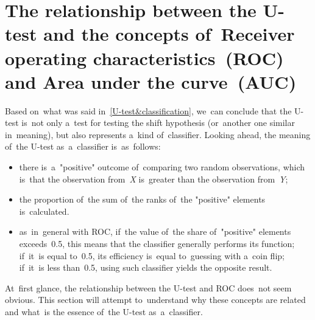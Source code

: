 \documentclass[]{scrreprt}
\begin{document}
\section{The relationship between the U-test and the concepts of~Receiver operating characteristics~(ROC) and Area under the curve~(AUC)}\label{U-AUC}
Based on~what was said in~\ref{U-test&classification}, we~can conclude that the U-test is~not only a~test for testing the shift hypothesis (or~another one similar in~meaning), but also represents a~kind of~classifier. Looking ahead, the meaning of~the U-test as~a~classifier is~as~follows:
\begin{itemize}
	\item there is~a~"positive" outcome of~comparing two random observations, which is~that the observation from~\textit{X} is~greater than the observation from~\textit{Y};
	\item the proportion of~the sum of~the ranks of~the "positive" elements is~calculated.
	\item as~in~general with ROC, if~the value of~the share of~"positive" elements exceeds~0.5, this means that the classifier generally performs its function; if~it~is equal to~0.5, its efficiency is~equal to~guessing with a~coin flip; if~it~is less than~0.5, using such classifier yields the opposite result.	 
\end{itemize}
At~first glance, the relationship between the U-test and ROC does~not seem obvious. This section will attempt to~understand why these concepts are related and what~is the essence of~the U-test as~a~classifier.
\end{document}
